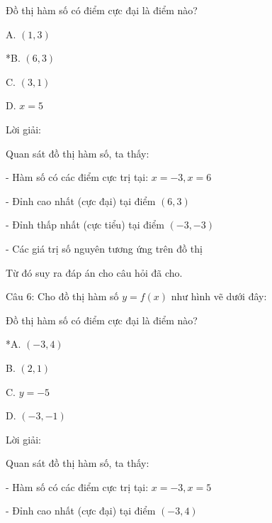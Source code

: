 \documentclass[a4paper,12pt]{article}
\begin{document}
Đồ thị hàm số có điểm cực đại là điểm nào?

A. \((1,3)\)

*B. \((6,3)\)

C. \((3,1)\)

D. \(x=5\)

Lời giải:


            Quan sát đồ thị hàm số, ta thấy:

- Hàm số có các điểm cực trị tại: \(x = -3, x = 6\)

- Đỉnh cao nhất (cực đại) tại điểm \((6, 3)\)

- Đỉnh thấp nhất (cực tiểu) tại điểm \((-3, -3)\)

- Các giá trị số nguyên tương ứng trên đồ thị

Từ đó suy ra đáp án cho câu hỏi đã cho.




Câu 6: Cho đồ thị hàm số \(y=f(x)\) như hình vẽ dưới đây:




Đồ thị hàm số có điểm cực đại là điểm nào?

*A. \((-3,4)\)

B. \((2,1)\)

C. \(y=-5\)

D. \((-3,-1)\)

Lời giải:


            Quan sát đồ thị hàm số, ta thấy:

- Hàm số có các điểm cực trị tại: \(x = -3, x = 5\)

- Đỉnh cao nhất (cực đại) tại điểm \((-3, 4)\)
\end{document}
